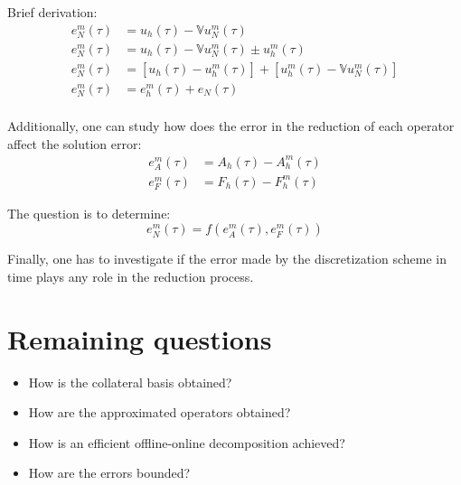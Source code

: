 \documentclass[../main.tex]{subfiles}
\begin{document}
Brief derivation:
\begin{align*}
    e_{N}^{m}(\tau) &= u_h(\tau) - \mathbb{V}u_N^m(\tau) \\
    e_{N}^{m}(\tau) &= u_h(\tau) - \mathbb{V}u_N^m(\tau) \pm u_h^m(\tau) \\
    e_{N}^{m}(\tau) &= 
    \left[u_h(\tau) - u_h^m(\tau)\right] 
    +
    \left[u_h^m(\tau) - \mathbb{V}u_N^m(\tau)\right] \\
    e_{N}^{m}(\tau) &= e_{h}^{m}(\tau) + e_{N}(\tau) \\
\end{align*}

Additionally, one can study how does the error in the reduction of each operator affect the solution error:
\begin{align*}
    e^m_A(\tau) &= A_h(\tau) - A_h^m(\tau) \\
    e^m_F(\tau) &= F_h(\tau) - F_h^m(\tau)
\end{align*}

The question is to determine:
\begin{equation*}
    e_{N}^{m}(\tau) = f\left(e^m_A(\tau), e^m_F(\tau)\right)
\end{equation*}

Finally, one has to investigate if the error made by the discretization scheme in time plays any role in the reduction process.

\section{Remaining questions}
\begin{itemize}
    \item How is the collateral basis obtained?
    \item How are the approximated operators obtained?
    \item How is an efficient offline-online decomposition achieved?
    \item How are the errors bounded?
\end{itemize}
\end{document}
